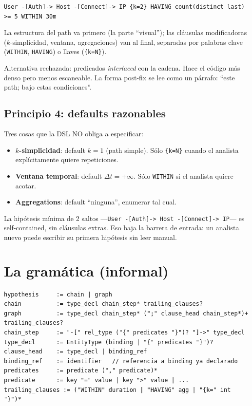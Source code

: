 \begin{lstlisting}
User -[Auth]-> Host -[Connect]-> IP {k=2} HAVING count(distinct last) >= 5 WITHIN 30m
\end{lstlisting}

\noindent
La estructura del path va primero (la parte ``visual''); las
cláusulas modificadoras (\(k\)-simplicidad, ventana, agregaciones)
van al final, separadas por palabras clave (\texttt{WITHIN},
\texttt{HAVING}) o llaves (\texttt{\{k=N\}}).

Alternativa rechazada: predicados \emph{interlaced} con la cadena.
Hace el código más denso pero menos escaneable. La forma post-fix
se lee como un párrafo: ``este path; bajo estas condiciones''.

\subsection{Principio 4: defaults razonables}

Tres cosas que la DSL NO obliga a especificar:

\begin{itemize}
    \item \textbf{\(k\)-simplicidad}: default \(k = 1\) (path
    simple). Sólo \texttt{\{k=N\}} cuando el analista explícitamente
    quiere repeticiones.
    \item \textbf{Ventana temporal}: default \(\Delta t = +\infty\).
    Sólo \texttt{WITHIN} si el analista quiere acotar.
    \item \textbf{Aggregations}: default ``ninguna'', enumerar
    tal cual.
\end{itemize}

\noindent
La hipótesis mínima de 2 saltos ---\texttt{User -[Auth]-> Host
-[Connect]-> IP}--- es self-contained, sin cláusulas extras. Eso
baja la barrera de entrada: un analista nuevo puede escribir su
primera hipótesis sin leer manual.

\section{La gramática (informal)}

\begin{lstlisting}
hypothesis     := chain | graph
chain          := type_decl chain_step* trailing_clauses?
graph          := type_decl chain_step* (";" clause_head chain_step*)+ trailing_clauses?
chain_step     := "-[" rel_type ("{" predicates "}")? "]->" type_decl
type_decl      := EntityType (binding | "{" predicates "}")?
clause_head    := type_decl | binding_ref
binding_ref    := identifier   // referencia a binding ya declarado
predicates     := predicate ("," predicate)*
predicate      := key "=" value | key ">" value | ...
trailing_clauses := ("WITHIN" duration | "HAVING" agg | "{k=" int "}")*
\end{lstlisting}

